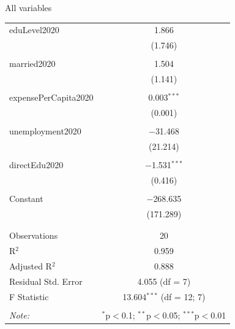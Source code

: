 \documentclass[compress]{beamer}
\begin{document}
\begin{frame}{All variables}
\begin{table}[!htbp]
\begin{multicols}{2}
\begin{tabular}{@{\extracolsep{5pt}}lc}
                 eduLevel2020 & 1.866 \\ 
                  & (1.746) \\ 
                  & \\ 
                 married2020 & 1.504 \\ 
                  & (1.141) \\ 
                  & \\ 
                 expensePerCapita2020 & 0.003$^{***}$ \\ 
                  & (0.001) \\ 
                  & \\ 
                 unemployment2020 & $-$31.468 \\ 
                  & (21.214) \\ 
                  & \\ 
                 directEdu2020 & $-$1.531$^{***}$ \\ 
                  & (0.416) \\ 
                  & \\ 
                 Constant & $-$268.635 \\ 
                  & (171.289) \\ 
                  & \\ 
                \hline \\[-1.8ex] 
                Observations & 20 \\ 
                R$^{2}$ & 0.959 \\ 
                Adjusted R$^{2}$ & 0.888 \\ 
                Residual Std. Error & 4.055 (df = 7) \\ 
                F Statistic & 13.604$^{***}$ (df = 12; 7) \\ 
                \hline 
                \hline \\[-1.8ex] 
                \textit{Note:}  & \multicolumn{1}{r}{$^{*}$p$<$0.1; $^{**}$p$<$0.05; $^{***}$p$<$0.01} \\ 
                \end{tabular} 
        \end{multicols}
      
      \end{table}
\end{frame}
\end{document}
